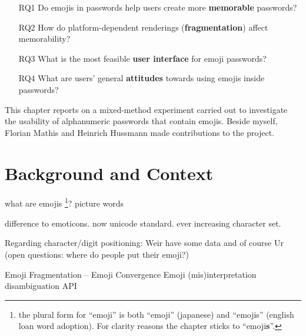 

\begin{itemize}
	\item[RQ1] Do emojis in passwords help users create more \textbf{memorable} passwords?
	\item[RQ2] How do platform-dependent renderings (\textbf{fragmentation}) affect memorability?
	\item[RQ3] What is the most feasible \textbf{user interface} for emoji passwords?
	\item[RQ4] What are users' general \textbf{attitudes} towards using emojis inside passwords?
\end{itemize}

This chapter reports on a mixed-method experiment carried out to investigate the usability of alphanumeric passwords that contain emojis. Beside myself, Florian Mathis and Heinrich Hussmann made contributions to the project. 


\section{Background and Context}
what are emojis \footnote{the plural form for ``emoji'' is both ``emoji'' (japanese) and ``emojis'' (english loan word adoption). For clarity reasons the chapter sticks to ``emoji\textbf{s}''.}?  picture words \cite{Taggart2015NewWords}

difference to emoticons. now unicode standard. ever increasing character set. 

Regarding character/digit positioning: Weir \etal have some data \cite{Weir2010MetricsPolicies} and of course Ur \etal \cite{Ur2015PWCreationLab} (open questions: where do people put their emoji?)


Emoji Fragmentation -- Emoji Convergence 
Emoji (mis)interpretation 
\cite{Tigwell2016EmojiMisunderstandings}
\cite{Miller2015BlissfullyHappyEmoji}
\cite{Wijeratne2010} disambiguation API

